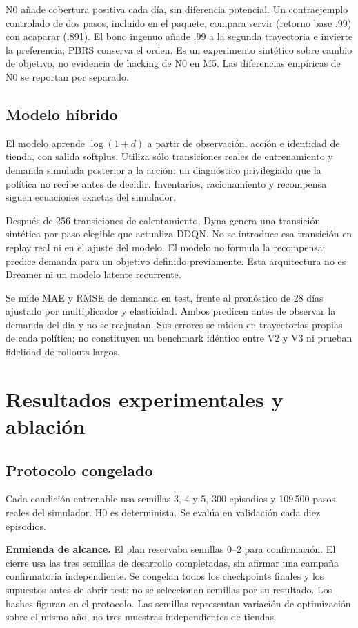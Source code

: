 \documentclass[conference]{IEEEtran}
\begin{document}
N0 añade cobertura positiva cada día, sin diferencia potencial. Un contraejemplo controlado de dos pasos, incluido en el paquete, compara servir (retorno base .99) con acaparar (.891). El bono ingenuo añade .99 a la segunda trayectoria e invierte la preferencia; PBRS conserva el orden. Es un experimento sintético sobre cambio de objetivo, no evidencia de hacking de N0 en M5. Las diferencias empíricas de N0 se reportan por separado.

\subsection{Modelo híbrido}
El modelo aprende $\log(1+d)$ a partir de observación, acción e identidad de tienda, con salida softplus. Utiliza sólo transiciones reales de entrenamiento y demanda simulada posterior a la acción: un diagnóstico privilegiado que la política no recibe antes de decidir. Inventarios, racionamiento y recompensa siguen ecuaciones exactas del simulador.

Después de 256 transiciones de calentamiento, Dyna genera una transición sintética por paso elegible que actualiza DDQN. No se introduce esa transición en replay real ni en el ajuste del modelo. El modelo no formula la recompensa: predice demanda para un objetivo definido previamente. Esta arquitectura no es Dreamer ni un modelo latente recurrente.

Se mide MAE y RMSE de demanda en test, frente al pronóstico de 28 días ajustado por multiplicador y elasticidad. Ambos predicen antes de observar la demanda del día y no se reajustan. Sus errores se miden en trayectorias propias de cada política; no constituyen un benchmark idéntico entre V2 y V3 ni prueban fidelidad de rollouts largos.

\section{Resultados experimentales y ablación}
\subsection{Protocolo congelado}
Cada condición entrenable usa semillas 3, 4 y 5, 300 episodios y 109\,500 pasos reales del simulador. H0 es determinista. Se evalúa en validación cada diez episodios.

\textbf{Enmienda de alcance.} El plan reservaba semillas 0--2 para confirmación. El cierre usa las tres semillas de desarrollo completadas, sin afirmar una campaña confirmatoria independiente. Se congelan todos los checkpoints finales y los supuestos antes de abrir test; no se seleccionan semillas por su resultado. Los hashes figuran en el protocolo. Las semillas representan variación de optimización sobre el mismo año, no tres muestras independientes de tiendas.
\end{document}
